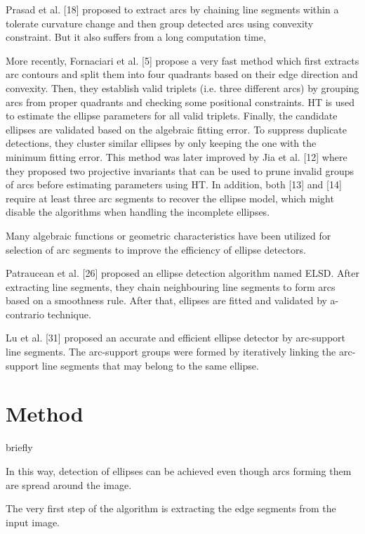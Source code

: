 \documentclass[a4paper]{report}
\begin{document}
Prasad et al. [18] proposed to extract arcs by chaining line segments within a tolerate curvature change and then group detected arcs using convexity constraint. 
But it also suffers from a long computation time,
  

More recently, Fornaciari et al. [5] propose a very fast method which first extracts arc contours and split them into four quadrants based on their edge direction and convexity. Then, they establish valid triplets (i.e. three different arcs) by grouping arcs from proper quadrants and checking some positional constraints. HT is used to estimate the ellipse parameters for all valid triplets. Finally, the candidate ellipses are validated based on the algebraic fitting error. To suppress duplicate detections, they cluster similar ellipses by only keeping the one with the minimum fitting error. This method was later improved by Jia et al. [12] where they proposed two projective invariants that can be used to prune invalid groups of arcs before estimating parameters using HT.%
In addition, both [13] and [14] require at least three arc segments to recover the ellipse model, which might disable the algorithms when handling the incomplete ellipses.


Many algebraic functions or geometric characteristics have been utilized for selection of arc segments to improve the efficiency of ellipse detectors.

Patraucean et al. [26] proposed an ellipse detection algorithm named ELSD. After extracting line segments, they chain neighbouring line segments to form arcs based on a smoothness rule. After that, ellipses are fitted and validated by a-contrario technique.  


Lu et al. [31] proposed an accurate and efficient ellipse detector by arc-support line segments. The arc-support groups were formed by iteratively linking the arc-support line segments that may belong to the same ellipse. 





\section{Method}
briefly

In this way, detection of ellipses can be achieved even though arcs forming them are spread around the image.

The very first step of the algorithm is extracting the edge segments from the input image.
\end{document}
